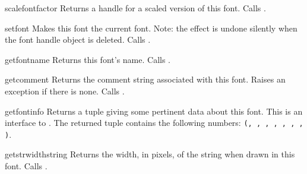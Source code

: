 \renewcommand{\indexsubitem}{(font handle method)}
\begin{funcdesc}{scalefont}{factor}
Returns a handle for a scaled version of this font.
Calls .
\end{funcdesc}

\begin{funcdesc}{setfont}{}
Makes this font the current font.
Note: the effect is undone silently when the font handle object is
deleted.
Calls .
\end{funcdesc}

\begin{funcdesc}{getfontname}{}
Returns this font's name.
Calls .
\end{funcdesc}

\begin{funcdesc}{getcomment}{}
Returns the comment string associated with this font.
Raises an exception if there is none.
Calls .
\end{funcdesc}

\begin{funcdesc}{getfontinfo}{}
Returns a tuple giving some pertinent data about this font.
This is an interface to .
The returned tuple contains the following numbers:
{\tt(, , , ,
, , , )}.
\end{funcdesc}

\begin{funcdesc}{getstrwidth}{string}
Returns the width, in pixels, of the string when drawn in this font.
Calls .
\end{funcdesc}

